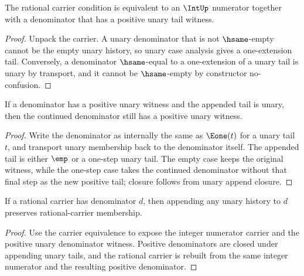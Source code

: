 \begin{theorem}
\label{thm:rat-carrier-iff-positive-unary-denominator}
The rational carrier condition is equivalent to an $\IntUp$ numerator together with a denominator that has a positive unary tail witness.
\end{theorem}
\begin{proof}
Unpack the carrier. A unary denominator that is not $\hsame$-empty cannot be the empty unary history, so unary case analysis gives a one-extension tail. Conversely, a denominator $\hsame$-equal to a one-extension of a unary tail is unary by transport, and it cannot be $\hsame$-empty by constructor no-confusion.
\end{proof}

\begin{theorem}
\label{thm:rat-positive-denominator-append-unary-tail}
If a denominator has a positive unary witness and the appended tail is unary, then the continued denominator still has a positive unary witness.
\end{theorem}
\begin{proof}
Write the denominator as internally the same as \(\Eone(t)\) for a unary tail \(t\), and transport unary membership back to the denominator itself. The appended tail is either \(\emp\) or a one-step unary tail. The empty case keeps the original witness, while the one-step case takes the continued denominator without that final step as the new positive tail; closure follows from unary append closure.
\end{proof}

\begin{theorem}
\label{thm:rat-carrier-append-unary-denominator-closed}
If a rational carrier has denominator \(d\), then appending any unary history to
\(d\) preserves rational-carrier membership.
\end{theorem}
\begin{proof}
Use the carrier equivalence to expose the integer numerator carrier and the
positive unary denominator witness. Positive denominators are closed under
appending unary tails, and the rational carrier is rebuilt from the same
integer numerator and the resulting positive denominator.
\end{proof}

